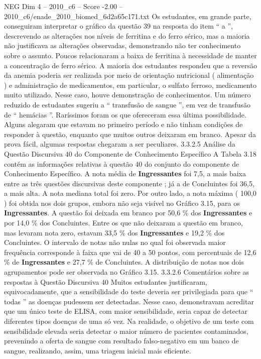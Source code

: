 \begin{textsample}{NEG Dim 4 – 2010\_c6 – Score -2.00 – 2010\_c6/enade\_2010\_biomed\_6d2a65c171.txt}
Os estudantes, em grande parte, conseguiram interpretar o gráfico da questão 39 na resposta do item “ a ”, descrevendo as alterações nos níveis de ferritina e do ferro sérico, mas a maioria não justificava as alterações observadas, demonstrando não ter conhecimento sobre o assunto.
Poucos relacionaram a baixa de ferritina à necessidade de manter a concentração de ferro sérico.
A maioria dos estudantes respondeu que a reversão da anemia poderia ser realizada por meio de orientação nutricional ( alimentação ) e administração de medicamentos, em particular, o sulfato ferroso, medicamento muito utilizado.
Nesse caso, houve demonstração de conhecimentos.
Um número reduzido de estudantes sugeriu a “ transfusão de sangue ”, em vez de transfusão de “ hemácias ”.
Raríssimos foram os que ofereceram essa última possibilidade.
Alguns alegaram que estavam no primeiro período e não tinham condições de responder à questão, enquanto que muitos outros deixaram em branco.
Apesar da prova fácil, algumas respostas chegaram a ser peculiares. 3.3.2.5 Análise da Questão Discursiva 40 do Componente de Conhecimento Específico A Tabela 3.18 contém as informações relativas à questão 40 do conjunto do componente de Conhecimento Específico.
A nota média de \textbf{Ingressantes} foi 7,5, a mais baixa entre as três questões discursivas deste componente ; já a de Concluintes foi 36,5, a mais alta.
A nota mediana total foi zero.
Por outro lado, a nota máxima ( 100,0 ) foi obtida nos dois grupos, embora não seja visível no Gráfico 3.15, para os \textbf{Ingressantes}.
A questão foi deixada em branco por 50,6 \% dos \textbf{Ingressantes} e por 14,0 \% dos Concluintes.
Entre os que não deixaram a questão em branco, mas levaram nota zero, estavam 33,5 \% dos \textbf{Ingressantes} e 19,2 \% dos Concluintes.
O intervalo de notas não nulas no qual foi observada maior frequência corresponde à faixa que vai de 40 a 50 pontos, com percentuais de 12,6 \% de \textbf{Ingressantes} e 27,7 \% de Concluintes.
A distribuição de notas nos dois agrupamentos pode ser observada no Gráfico 3.15. 3.3.2.6 Comentários sobre as respostas à Questão Discursiva 40 Muitos estudantes justificaram, equivocadamente, que a sensibilidade do teste deveria ser privilegiada para que “ todas ” as doenças pudessem ser detectadas.
Nesse caso, demonstravam acreditar que um único teste de ELISA, com maior sensibilidade, seria capaz de detectar diferentes tipos doenças de uma só vez.
Na realidade, o objetivo de um teste com sensibilidade elevada seria detectar o maior número de pacientes contaminados, prevenindo a oferta de sangue com resultado falso-negativo em um banco de sangue, realizando, assim, uma triagem inicial mais eficiente.

\end{textsample}
